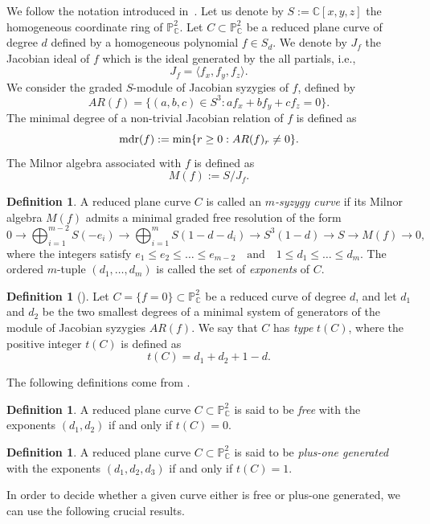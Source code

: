 \documentclass[11pt]{article}
\theoremstyle{plain}
\theoremstyle{definition}
\newtheorem{definition}[theorem]{Definition}
\theoremstyle{remark}
\newcommand{\mdr}{{\rm mdr}}
\begin{document}
We follow the notation introduced in~\cite{Dimca}.
Let us denote by $S := \mathbb{C}[x,y,z]$ the homogeneous coordinate ring of
$\mathbb{P}^2_{\mathbb{C}}$.
Let $C \subset \mathbb{P}^2_{\mathbb{C}}$ be a reduced plane curve of degree $d$
defined by a homogeneous polynomial $f \in S_d$.
We denote by $J_f$ the Jacobian ideal of $f$ which is the ideal generated by the all partials, i.e.,
\[
J_f = \langle f_x, f_y, f_z \rangle.
\]
We consider the graded $S$-module of Jacobian syzygies of $f$, defined by
\[
AR(f) = \{ (a,b,c) \in S^3 : a f_x + b f_y + c f_z = 0 \}.
\]
The minimal degree of a non-trivial Jacobian relation of $f$ is defined as
\[
\mdr(f) := \min \{ r \ge 0 : AR(f)_r \neq 0 \}.
\]
The Milnor algebra associated with $f$ is defined as
\[
M(f) := S / J_f.
\]

\begin{definition}
A reduced plane curve $C$ is called an \emph{$m$-syzygy curve} if its Milnor
algebra $M(f)$ admits a minimal graded free resolution of the form
\[
0 \longrightarrow \bigoplus_{i=1}^{m-2} S(-e_i)
\longrightarrow \bigoplus_{i=1}^{m} S(1-d-d_i)
\longrightarrow S^3(1-d)
\longrightarrow S
\longrightarrow M(f)
\longrightarrow 0,
\]
where the integers satisfy
$
e_1 \le e_2 \le \ldots \le e_{m-2}
\quad \text{and} \quad
1 \le d_1 \le \ldots \le d_m.
$
The ordered $m$-tuple $(d_1,\ldots,d_m)$ is called the set of \emph{exponents} of
$C$.
\end{definition}

\begin{definition}[{\cite[Definition 1.1]{her}}]
Let $C =\{f = 0\}\subset \mathbb{P}^{2}_{\mathbb{C}}$ be a reduced curve of degree $d$, and let $d_1$ and $d_2$ be the two smallest degrees of a minimal system of generators of the module of Jacobian syzygies $AR(f)$.  
We say that $C$ has \emph{type} $t(C)$, where the positive integer $t(C)$ is defined as
\[t(C) = d_1 + d_2 + 1 - d.\]
\end{definition}
The following definitions come from \cite[Theorem 1.1]{her}.
\begin{definition}
A reduced plane curve $C \subset \mathbb{P}^2_{\mathbb{C}}$ is said to be \emph{free} with the exponents $(d_{1},d_{2})$ if and only if $t(C)=0$.
\end{definition}
\begin{definition}
A reduced plane curve $C \subset \mathbb{P}^2_{\mathbb{C}}$ is said to be \emph{plus-one generated} with the exponents $(d_1,d_2,d_3)$ if and only if $t(C)=1$.
\end{definition}
In order to decide whether a given curve either is free or plus-one generated, we can use the following crucial results.
\end{document}
